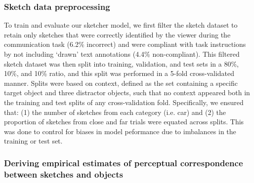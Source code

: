 \documentclass[9pt,twocolumn,twoside]{pnas-new}
\begin{document}
{%

\subsubsection*{Sketch data preprocessing} 
To train and evaluate our sketcher model, we first filter the sketch dataset to retain only sketches that were correctly identified by the viewer during the communication task (6.2\% incorrect) and were compliant with task instructions by not including `drawn' text annotations (4.4\% non-compliant). 
This filtered sketch dataset was then split into training, validation, and test sets in a 80\%, 10\%, and 10\% ratio, and this split was performed in a 5-fold cross-validated manner.
Splits were based on context, defined as the set containing a specific target object and three distractor objects, such that no context appeared both in the training and test splits of any cross-validation fold. 
Specifically, we ensured that: (1) the number of sketches from each category (i.e. car) and (2) the proportion of sketches from close and far trials were equated across splits. 
This was done to control for biases in model peformance due to imbalances in the training or test set.

\subsubsection*{Deriving empirical estimates of perceptual correspondence between sketches and objects}

}
\end{document}
